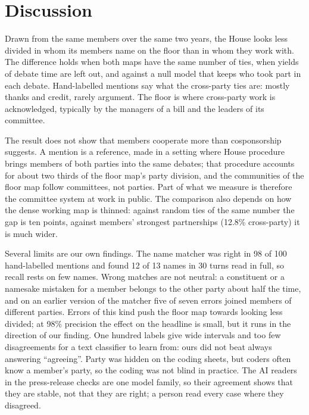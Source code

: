\documentclass[9pt,twocolumn,twoside]{pnas-new}
\begin{document}
\section*{Discussion}

Drawn from the same members over the same two years, the House looks less divided in whom its members name on the
floor than in whom they work with. The difference holds when both maps have the same number of ties, when yields
of debate time are left out, and against a null model that keeps who took part in each debate. Hand-labelled
mentions say what the cross-party ties are: mostly thanks and credit, rarely argument. The floor is where
cross-party work is acknowledged, typically by the managers of a bill and the leaders of its committee.

The result does not show that members cooperate more than cosponsorship suggests. A mention is a reference, made
in a setting where House procedure brings members of both parties into the same debates; that procedure accounts
for about two thirds of the floor map's party division, and the communities of the floor map follow committees,
not parties. Part of what we measure is therefore the committee system at work in public. The comparison also
depends on how the dense working map is thinned: against random ties of the same number the gap is ten points,
against members' strongest partnerships (12.8\% cross-party) it is much wider.

Several limits are our own findings. The name matcher was right in 98 of 100 hand-labelled mentions and found 12
of 13 names in 30 turns read in full, so recall rests on few names. Wrong matches are not neutral: a constituent or a
namesake mistaken for a member belongs to the other party about half the time, and on an earlier version of the
matcher five of seven errors joined members of different parties. Errors of this kind push the floor map towards
looking less divided; at 98\% precision the effect on the headline is small, but it runs in the direction of our
finding. One hundred labels give wide intervals and too few disagreements for a text classifier to learn from: ours
did not beat always answering ``agreeing''. Party was hidden on the coding sheets, but coders often know a member's
party, so the coding was not blind in practice. The AI readers in the press-release checks are one model family, so
their agreement shows that they are stable, not that they are right; a person read every case where they disagreed.
\end{document}
